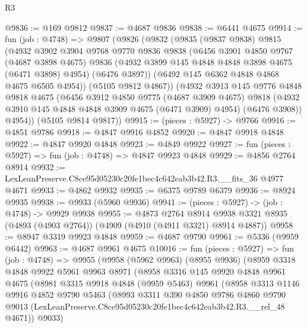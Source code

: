 \begin{lexlean}{R3}
\begin{coremodule}
@9836 := @169 @9812
@9837 := @4687 @9836
@9838 := @6441 @4675
@9914 := fun (job : @4748) =>
  @9807
    (@9826
      (@9832
        (@9835
          (@9837 @9838)
          @9815
          (@4932
            @3902
            @3904
            @9768
            @9770
            @9836
            @9838
            (@6456
              @3901
              @4850
              @9767
              (@4687 @3898 @4675)
              @9836
              (@4932 @3899 @145 @4848 @4848 @3898 @4675 (@6471 @3898) @4954)
              (@6476 @3897))
            (@6492 @145 @6362 @4848 @4868 @4675 @6505 @4954))
          (@5105 @9812 @4867))
        (@4932
          @3913
          @145
          @9776
          @4848
          @9818
          @4675
          (@6456
            @3912
            @4850
            @9775
            (@4687 @3909 @4675)
            @9818
            (@4932 @3910 @145 @4848 @4848 @3909 @4675 (@6471 @3909) @4954)
            (@6476 @3908))
          @4954))
      (@5105 @9814 @9817))
@9915 := (pieces : @5927) -> @9766
@9916 := @4851 @9786
@9918 := @4847 @9916 @4852
@9920 := @4847 @9918 @4848
@9922 := @4847 @9920 @4848
@9923 := @4849 @9922
@9927 := fun (pieces : @5927) => fun (job : @4748) => @4847 @9923 @4848
@9929 := @4856 @2764 @8914
@9932 := LexLeanPreserve.C8ce95d05230c20fe1bec4c642eab3b42.R3.__fits_36 @4977 @4671
@9933 := @4862 @9932
@9935 := @6375 @9789 @6379
@9936 := @8924 @9935
@9938 := @9933 (@5960 @9936)
@9941 := (pieces : @5927) -> (job : @4748) -> @9929 @9938
@9955 := @4873
    @2764
    @8914
    @9938
    @3321
    @8935
    (@4893 (@4903 @2764))
    (@4909 (@4910 (@4911 @3321) @8914 @4887))
@9958 := @8947 @3319 @9923 @4848
@9959 := @4687 @9790
@9961 := @5336 (@9959 @6442)
@9963 := @4687 @9961 @4675
@10016 := fun (pieces : @5927) =>
  fun (job : @4748) =>
  @9955
    (@9958
      (@5962 @9963)
      (@8955 @9936)
      (@8959
        @3318
        @4848
        @9922
        @5961
        @9963
        @8971
        (@8958
          @3316
          @145
          @9920
          @4848
          @9961
          @4675
          (@8981
            @3315
            @9918
            @4848
            (@9959 @5463)
            @9961
            (@8958
              @3313
              @1146
              @9916
              @4852
              @9790
              @5463
              (@8993
                @3311
                @390
                @4850
                @9786
                @4860
                @9790
                @9013
                (LexLeanPreserve.C8ce95d05230c20fe1bec4c642eab3b42.R3.__rel_48 @4671))
              @9033)

\end{coremodule}
\end{lexlean}
